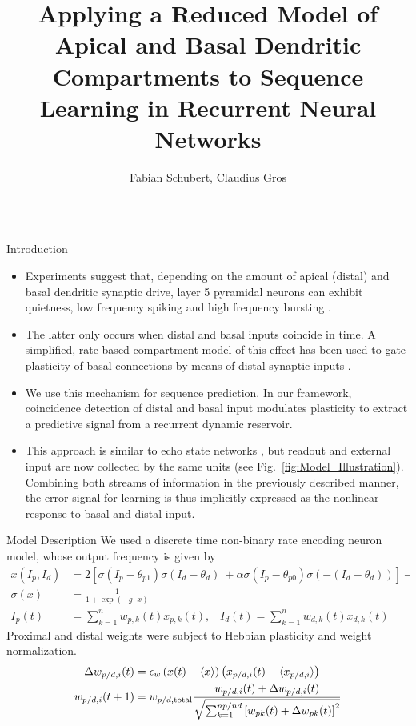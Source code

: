 \documentclass{beamer}
\title{Applying a Reduced Model of Apical and Basal Dendritic Compartments to Sequence Learning in Recurrent Neural Networks}
\author{Fabian Schubert, Claudius Gros}
\institute{Institute for Theoretical Physics, Goethe University Frankfurt a.M.}
\begin{document}
\begin{frame}[t]
\begin{columns}[t]
\begin{column}{.4\textwidth}

\begin{myblock}{Introduction}
\begin{itemize}
\item Experiments suggest that, depending on the amount of apical (distal) and basal dendritic synaptic drive, layer 5 pyramidal neurons can exhibit quietness, low frequency spiking and high frequency bursting \cite{Letzkus_2006,Shai_2015}.
\item The latter only occurs when distal and basal inputs coincide in time. A simplified, rate based compartment model of this effect has been used to gate plasticity of basal connections by means of distal synaptic inputs \cite{Bono_2017}.
\item We use this mechanism for sequence prediction. In our framework, coincidence detection of distal and basal input modulates plasticity to extract a predictive signal from a recurrent dynamic reservoir.
\item This approach is similar to echo state networks \cite{Jaeger_2010}, but readout and external input are now collected by the same units (see Fig.~\ref{fig:Model_Illustration}). Combining both streams of information in the previously described manner, the error signal for learning is thus implicitly expressed as the nonlinear response to basal and distal input.
\end{itemize}
\end{myblock}

\begin{myblock}{Model Description}
We used a discrete time non-binary rate encoding neuron model, whose output frequency is given by
\begin{align*}
x\left(I_p,I_d\right) &= 2 \left[ \sigma\left(I_p-\theta_{p1}\right) \sigma\left(I_d-\theta_d\right)\ +\alpha\sigma\left(I_p-\theta_{p0}\right)\sigma\left(-\left(I_d-\theta_d\right)\right)\right] - 1 \\
\sigma\left(x\right) &= \frac{1}{1+\exp(-g\cdot x)} \\
I_p (t) &= \sum_{k=1}^n w_{p,k} (t) x_{p,k} (t) , \;\;\; I_d (t) = \sum_{k=1}^n w_{d,k} (t) x_{d,k} (t)
\end{align*}
Proximal and distal weights were subject to Hebbian plasticity and weight normalization.
\begin{align*}
\Delta w_{p/d,i} (t) &= \epsilon_w \left(x(t)-\langle x \rangle\right)\left(x_{p/d,i}(t)-\langle x_{p/d,i} \rangle \right) \\
w_{p/d,i}(t+1) &= w_{p/d,\rm total} \frac{w_{p/d,i}(t) + \Delta w_{p/d,i}(t)}{\sqrt{\sum_{k=1}^{np/nd} \left[ w_{pk}(t) + \Delta w_{pk}(t) \right]^2}}
\end{align*}
\end{myblock}


\end{column}
\end{columns}
\end{frame}
\end{document}
